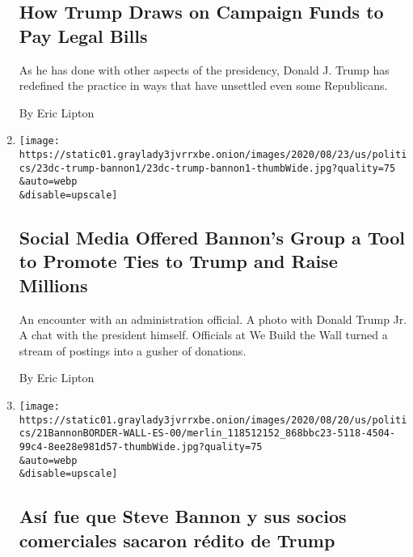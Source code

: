 \begin{enumerate}
  \hypertarget{how-trump-draws-on-campaign-funds-to-pay-legal-bills}{%
  \subsection{How Trump Draws on Campaign Funds to Pay Legal
  Bills}\label{how-trump-draws-on-campaign-funds-to-pay-legal-bills}}

  As he has done with other aspects of the presidency, Donald J. Trump
  has redefined the practice in ways that have unsettled even some
  Republicans.

  By Eric Lipton
\item
  \href{/2020/08/24/us/politics/trump-bannon-we-build-the-wall.html}{}

  \texttt{[image: https://static01.graylady3jvrrxbe.onion/images/2020/08/23/us/politics/23dc-trump-bannon1/23dc-trump-bannon1-thumbWide.jpg?quality=75\\\&auto=webp\\\&disable=upscale]}

  \hypertarget{social-media-offered-bannons-group-a-tool-to-promote-ties-to-trump-and-raise-millions}{%
  \subsection{Social Media Offered Bannon's Group a Tool to Promote Ties
  to Trump and Raise
  Millions}\label{social-media-offered-bannons-group-a-tool-to-promote-ties-to-trump-and-raise-millions}}

  An encounter with an administration official. A photo with Donald
  Trump Jr. A chat with the president himself. Officials at We Build the
  Wall turned a stream of postings into a gusher of donations.

  By Eric Lipton
\item
  \href{/es/2020/08/21/espanol/estados-unidos/steve-bannon-muro-fraude.html}{}

  \texttt{[image: https://static01.graylady3jvrrxbe.onion/images/2020/08/20/us/politics/21BannonBORDER-WALL-ES-00/merlin\_118512152\_868bbc23-5118-4504-99c4-8ee28e981d57-thumbWide.jpg?quality=75\\\&auto=webp\\\&disable=upscale]}

  \hypertarget{asuxed-fue-que-steve-bannon-y-sus-socios-comerciales-sacaron-ruxe9dito-de-trump}{%
  \subsection{Así fue que Steve Bannon y sus socios comerciales sacaron
  rédito de
  Trump}\label{asuxed-fue-que-steve-bannon-y-sus-socios-comerciales-sacaron-ruxe9dito-de-trump}}


\end{enumerate}
